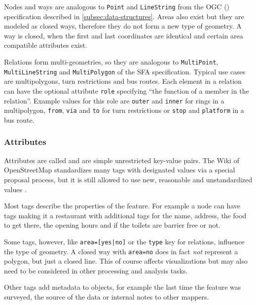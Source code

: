 			Nodes and ways are analogous to \texttt{Point} and \texttt{LineString} from the OGC  () specification described in \cref{subsec:data-structures}.
			Areas also exist but they are modeled as closed ways, therefore they do not form a new type of geometry.
			A way is closed, when the first and last coordinates are identical and certain area compatible attributes exist.
			
			Relations form multi-geometries, so they are analogous to \texttt{MultiPoint}, \texttt{MultiLineString} and \texttt{MultiPolygon} of the SFA specification.
			Typical use cases are multipolygons, turn restrictions and bus routes.
			Each element in a relation can have the optional attribute \texttt{role} specifying \enquote{the function of a member in the relation}\cite{osm-wiki-relation}.
			Example values for this role are \texttt{outer} and \texttt{inner} for rings in a multipolygon, \texttt{from}, \texttt{via} and \texttt{to} for turn restrictions or \texttt{stop} and \texttt{platform} in a bus route.
			
		\subsubsection{Attributes}
		\label{subsubsec:osm-attributes}
			
			Attributes are called  and are simple unrestricted key-value pairs.
			The Wiki of OpenStreetMap standardizes many tags with designated values via a special proposal process, but it is still allowed to use new, reasonable and unstandardized values \cite{osm-wiki-proposal-process}.
			
			Most tags describe the properties of the feature.
			For example a node can have tags making it a restaurant with additional tags for the name, address, the food to get there, the opening hours and if the toilets are barrier free or not.
			
			Some tags, however, like \texttt{area=[yes|no]} or the \texttt{type} key for relations, influence the type of geometry.
			A closed way with \texttt{area=no} does in fact \textit{not} represent a polygon, but just a closed line.
			This of course affects visualizations but may also need to be considered in other processing and analysis tasks.
			
			Other tags add metadata to objects, for example the last time the feature was surveyed, the source of the data or internal notes to other mappers.
			
